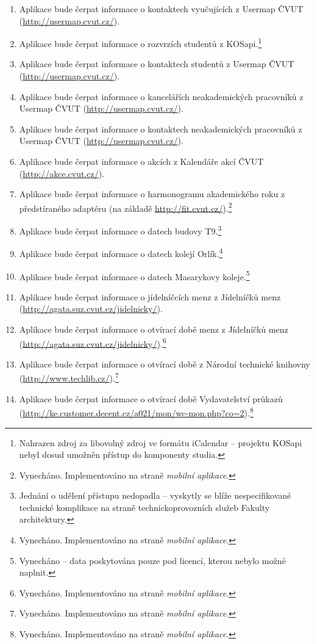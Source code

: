 \begin{enumerate}
 \item Aplikace bude čerpat informace o kontaktech vyučujících z Usermap ČVUT (\url{http://usermap.cvut.cz/}).
 \item Aplikace bude čerpat informace o rozvrzích studentů z KOSapi.\footnote{Nahrazen zdroj za libovolný zdroj ve formátu iCalendar -- projektu KOSapi nebyl dosud umožněn přístup do komponenty studia.}
 \item Aplikace bude čerpat informace o kontaktech studentů z Usermap ČVUT (\url{http://usermap.cvut.cz/}).
 \item Aplikace bude čerpat informace o kancelářích neakademických pracovníků z Usermap ČVUT (\url{http://usermap.cvut.cz/}).
 \item Aplikace bude čerpat informace o kontaktech neakademických pracovníků z Usermap ČVUT (\url{http://usermap.cvut.cz/}).
 \item Aplikace bude čerpat informace o akcích  z Kalendáře akcí ČVUT (\url{http://akce.cvut.cz/}).
 \item Aplikace bude čerpat informace o harmonogramu akademického roku z předstíraného adaptéru (na základě \url{http://fit.cvut.cz/}).\footnote{Vynecháno. Implementováno na straně \textit{mobilní aplikace}.}
 \item Aplikace bude čerpat informace o datech  budovy T9.\footnote{Jednání o udělení přístupu nedopadla -- vyskytly se blíže nespecifikované technické komplikace na straně technickoprovozních služeb Fakulty architektury.}
 \item Aplikace bude čerpat informace o datech  kolejí Orlík.\footnote{Vynecháno. Implementováno na straně \textit{mobilní aplikace}.}
 \item Aplikace bude čerpat informace o datech  Masarykovy koleje.\footnote{Vynecháno -- data poskytována pouze pod licencí, kterou nebylo možné naplnit.}
 \item Aplikace bude čerpat informace o jídelníčcích menz z Jídelníčků menz (\url{http://agata.suz.cvut.cz/jidelnicky/}).
 \item Aplikace bude čerpat informace o otvírací době menz z Jídelníčků menz (\url{http://agata.suz.cvut.cz/jidelnicky/}).\footnote{Vynecháno. Implementováno na straně \textit{mobilní aplikace}.}
 \item Aplikace bude čerpat informace o otvírací době  z Národní technické knihovny (\url{http://www.techlib.cz/}).\footnote{Vynecháno. Implementováno na straně \textit{mobilní aplikace}.}
 \item Aplikace bude čerpat informace o otvírací době Vydavatelství průkazů (\url{http://ke.customer.decent.cz/a021/mon/wc-mon.php?co=2}).\footnote{Vynecháno. Implementováno na straně \textit{mobilní aplikace}.}

\end{enumerate}
